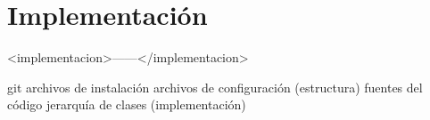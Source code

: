 \chapter{Implementación}
\label{chap:implementación}

<implementacion>------</implementacion>

git
archivos de instalación
archivos de configuración (estructura)
fuentes del código
jerarquía de clases (implementación)
